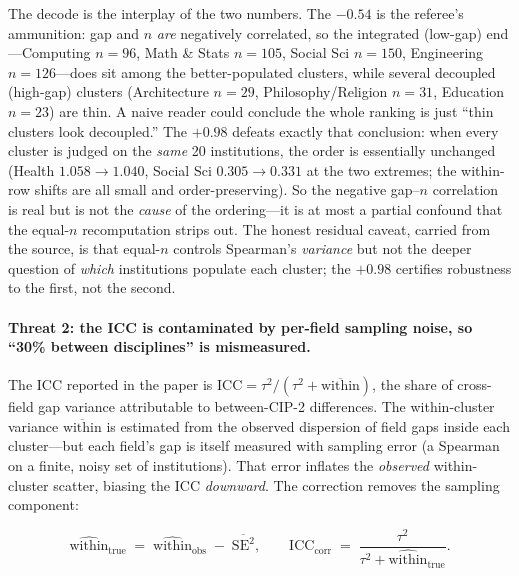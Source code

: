 \documentclass[11pt]{article}
\begin{document}
The decode is the interplay of the two numbers. The $-0.54$ is the referee's ammunition: gap and $n$ \emph{are} negatively correlated, so the integrated (low-gap) end---Computing $n=96$, Math \& Stats $n=105$, Social Sci $n=150$, Engineering $n=126$---does sit among the better-populated clusters, while several decoupled (high-gap) clusters (Architecture $n=29$, Philosophy/Religion $n=31$, Education $n=23$) are thin. A naive reader could conclude the whole ranking is just ``thin clusters look decoupled.'' The $+0.98$ defeats exactly that conclusion: when every cluster is judged on the \emph{same} 20 institutions, the order is essentially unchanged (Health $1.058\to1.040$, Social Sci $0.305\to0.331$ at the two extremes; the within-row shifts are all small and order-preserving). So the negative gap--$n$ correlation is real but is not the \emph{cause} of the ordering---it is at most a partial confound that the equal-$n$ recomputation strips out. The honest residual caveat, carried from the source, is that equal-$n$ controls Spearman's \emph{variance} but not the deeper question of \emph{which} institutions populate each cluster; the $+0.98$ certifies robustness to the first, not the second.

\paragraph{Threat 2: the ICC is contaminated by per-field sampling noise, so ``30\% between disciplines'' is mismeasured.}
The ICC reported in the paper is $\mathrm{ICC}=\tau^2/(\tau^2+\overline{\text{within}})$, the share of cross-field gap variance attributable to between-CIP-2 differences. The within-cluster variance $\overline{\text{within}}$ is estimated from the observed dispersion of field gaps inside each cluster---but each field's gap is itself measured with sampling error (a Spearman on a finite, noisy set of institutions). That error inflates the \emph{observed} within-cluster scatter, biasing the ICC \emph{downward}. The correction removes the sampling component:

\[
\widehat{\text{within}}_{\text{true}} \;=\; \widehat{\text{within}}_{\text{obs}} \;-\; \overline{\mathrm{SE}^2},
\qquad
\mathrm{ICC}_{\text{corr}} \;=\; \frac{\tau^2}{\tau^2 + \widehat{\text{within}}_{\text{true}}} .
\]
\end{document}

